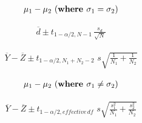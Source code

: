 \documentclass[12pt]{article}
\begin{document}
\pagestyle{empty}
\Large
{}
\pagecolor{ehandbook}

\boldmath

\begin{eqnarray*}
\mu_1 - \mu_2 \,\, (\mbox{\bf where } \sigma_1 = \sigma_2)
\end{eqnarray*}

\vspace*{.25in}

\begin{eqnarray*}
\overline{d} \pm t_{1-\alpha/2, N-1} \, \frac{s_d}{\sqrt{N}}
\end{eqnarray*}

\vspace*{.25in}

\begin{eqnarray*}
\overline{Y} - \overline{Z} \pm t_{1-\alpha/2, N_1+N_2-2} \,\, s\sqrt{\frac{1}{N_1}+\frac{1}{N_2}}
\end{eqnarray*}

\vspace*{.25in}


\begin{eqnarray*}
\mu_1 - \mu_2 \,\, (\mbox{\bf where } \sigma_1 \ne \sigma_2)
\end{eqnarray*}

\vspace*{.25in}

\begin{eqnarray*}
\overline{Y} - \overline{Z} \pm t_{1-\alpha/2, effective \, df} \,\, s\sqrt{\frac{s^2_1}{N_1}+\frac{s^2_2}{N_2}}
\end{eqnarray*}
\end{document}
